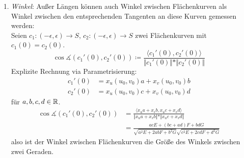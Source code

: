 \begin{remark}
\begin{enumerate}
  \item \emph{Winkel}: Außer Längen können auch Winkel zwischen Flächenkurven als Winkel zwischen den entsprechenden Tangenten an diese Kurven gemessen werden: \\
  Seien $ c_1: (-\epsilon, \epsilon) \to S $, $ c_2: (-\epsilon, \epsilon) \to S $ zwei Flächenkurven mit $ c_1(0) = c_2(0) $.
  \begin{equation*}
    \cos \measuredangle (c_1'(0),c_2'(0)) \coloneqq \frac{\langle c_1'(0), c_2'(0) \rangle}{\Vert c_1'(0) \Vert * \Vert c_2'(0) \Vert}
  \end{equation*}
  Explizite Rechnung via Parametrisierung:
  \begin{align*}
    c_1'(0) &= x_u(u_0, v_0)a + x_v(u_0,v_0)b \\
    c_2'(0) &= x_u(u_0, v_0)c + x_v(u_0,v_0)d
  \end{align*}
  für $ a,b,c,d \in \mathbb{R} $.
  \begin{align*}
    \cos \measuredangle (c_1'(0), c_2'(0)) &= \frac{\langle x_ua + x_vb, x_uc + x_vd \rangle}{\Vert x_ua + x_vb \Vert * \Vert x_uc + x_vd \Vert} \\
     &= \frac{acE + (bc + ad)F + bdG}{\sqrt{a^2E + 2abF + b^2G}\sqrt{c^2E + 2cdF + d^2G}}
  \end{align*}
  also ist der Winkel zwischen Flächenkurven die Größe des Winkels zwischen zwei Geraden.


\end{enumerate}
\end{remark}
